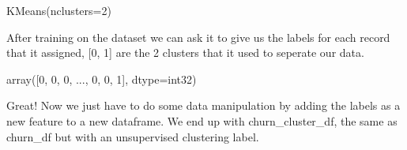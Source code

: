 \documentclass[letterpaper,10pt,english]{jupyterBook}
\begin{document}
\begin{sphinxVerbatim}[commandchars=\\\{\}]
  
\PYG{p}{[}\PYG{p}{]}
\end{sphinxVerbatim}

\begin{sphinxVerbatim}[commandchars=\\\{\}]
KMeans(n\PYGZus{}clusters=2)
\end{sphinxVerbatim}

\sphinxAtStartPar
After training on the dataset we can ask it to give us the labels for each record that it assigned, {[}0, 1{]} are the 2 clusters that it used to seperate our data.

\begin{sphinxVerbatim}[commandchars=\\\{\}]
\end{sphinxVerbatim}

\begin{sphinxVerbatim}[commandchars=\\\{\}]
array([0, 0, 0, ..., 0, 0, 1], dtype=int32)
\end{sphinxVerbatim}

\sphinxAtStartPar
Great! Now we just have to do some data manipulation by adding the labels as a new feature to a new dataframe. We end up with churn\_cluster\_df, the same as churn\_df but with an unsupervised clustering label.

\begin{sphinxVerbatim}[commandchars=\\\{\}]
  
\PYG{p}{[}\PYG{p}{]}  
\end{sphinxVerbatim}
\end{document}
